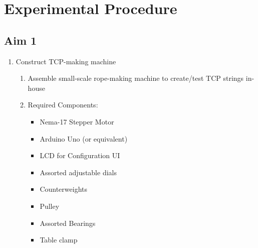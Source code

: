\section{Experimental Procedure}
\label{sect:experiments}

\subsection{Aim 1}
	\begin{enumerate}
		\item Construct TCP-making machine
		\begin{enumerate}
			\item Assemble small-scale rope-making machine to create/test TCP strings in-house
			\item Required Components:
			\begin{itemize}
				\item Nema-17 Stepper Motor
				\item Arduino Uno (or equivalent)
				\item LCD for Configuration UI
				\item Assorted adjustable dials
				\item Counterweights
				\item Pulley
				\item Assorted Bearings
				\item Table clamp
			\end{itemize}
		\end{enumerate}
		

\end{enumerate}
